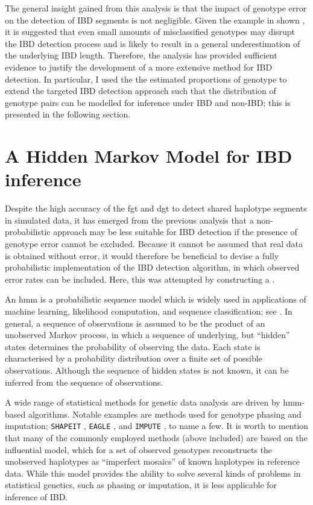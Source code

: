 The general insight gained from this analysis is that the impact of genotype error on the detection of IBD segments is not negligible.
Given the example in shown , it is suggested that even small amounts of misclassified genotypes may disrupt the IBD detection process and is likely to result in a general underestimation of the underlying IBD length.
Therefore, the analysis has provided sufficient evidence to justify the development of a more extensive method for IBD detection.
In particular, I used the the estimated proportions of genotype  to extend the targeted IBD detection approach such that the distribution of genotype pairs can be modelled for inference under IBD and non-IBD; this is presented in the following section.




%
\section{A Hidden Markov Model for IBD inference}
\label{sec:ibd_hmm_method}
%

Despite the high accuracy of the \gls{fgt} and \gls{dgt} to detect shared haplotype segments in simulated data, it has emerged from the previous analysis that a non-probabilistic approach may be less suitable for IBD detection if the presence of genotype error cannot be excluded.
Because it cannot be assumed that real data is obtained without error, it would therefore be beneficial to devise a fully probabilistic implementation of the IBD detection algorithm, in which observed error rates can be included.
Here, this was attempted by constructing a .

An \gls{hmm} is a probabilistic sequence model which is widely used in applications of machine learning, likelihood computation, and sequence classification; see \citet{Rabiner:1989hs}.
In general, a sequence of observations is assumed to be the product of an unobserved Markov process, in which a sequence of underlying, but ``hidden'' states determines the probability of observing the data.
Each state is characterised by a probability distribution over a finite set of possible observations.
Although the sequence of hidden states is not known, it can be inferred from the sequence of observations.

A wide range of statistical methods for genetic data analysis are driven by \gls{hmm}-based algorithms.
Notable examples are methods used for genotype phasing and imputation; \eg \texttt{SHAPEIT} \citep{Delaneau:2011iu},
\texttt{EAGLE} \citep{loh2016fast,Loh:2016bl}, and
\texttt{IMPUTE} \citep{Howie:2009hq,Howie:2011ji}, to name a few.
It is worth to mention that many of the commonly employed methods (above included) are based on the influential \citet{Li:2003uz} model, which for a set of observed genotypes reconstructs the unobserved haplotypes as ``imperfect mosaics'' of known haplotypes in reference data.
While this model provides the ability to solve several kinds of problems in statistical genetics, such as phasing or imputation, it is less applicable for inference of IBD.

